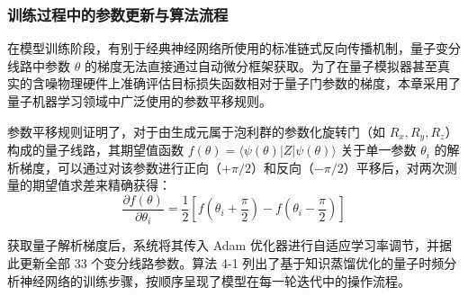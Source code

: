 \subsubsection{训练过程中的参数更新与算法流程}
\label{subsec:parameter_update}

在模型训练阶段，有别于经典神经网络所使用的标准链式反向传播机制，量子变分线路中参数 $\theta$ 的梯度无法直接通过自动微分框架获取。为了在量子模拟器甚至真实的含噪物理硬件上准确评估目标损失函数相对于量子门参数的梯度，本章采用了量子机器学习领域中广泛使用的参数平移规则。

参数平移规则证明了，对于由生成元属于泡利群的参数化旋转门（如 $R_x, R_y, R_z$）构成的量子线路，其期望值函数 $f(\theta) = \langle \psi(\theta) | Z | \psi(\theta) \rangle$ 关于单一参数 $\theta_i$ 的解析梯度，可以通过对该参数进行正向（$+\pi/2$）和反向（$-\pi/2$）平移后，对两次测量的期望值求差来精确获得：
\begin{equation}
	\frac{\partial f(\theta)}{\partial \theta_i} = \frac{1}{2} \left[ f\left(\theta_i + \frac{\pi}{2}\right) - f\left(\theta_i - \frac{\pi}{2}\right) \right]
\end{equation}

获取量子解析梯度后，系统将其传入 Adam 优化器进行自适应学习率调节，并据此更新全部 33 个变分线路参数。算法 4-1 列出了基于知识蒸馏优化的量子时频分析神经网络的训练步骤，按顺序呈现了模型在每一轮迭代中的操作流程。

